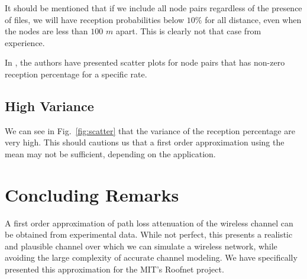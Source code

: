 \documentclass[11pt,twocolumn]{article}
\begin{document}
It should be mentioned that if we include all node pairs regardless of the presence of files, we will have reception probabilities below $10 \%$ for all distance, even when the nodes are less than $100$ $m$ apart.  This is clearly not that case from experience.

In \cite{Aguayo:2004lr}, the authors have presented scatter plots for node pairs that has non-zero reception percentage for a specific rate.

\subsection{High Variance}
We can see in Fig.~\ref{fig:scatter} that the variance of the reception percentage are very high.  This should cautions us that a first order approximation using the mean may not be sufficient, depending on the application.

\section{Concluding Remarks}
A first order approximation of path loss attenuation of the wireless channel can be obtained from experimental data.  While not perfect, this presents a realistic and plausible channel over which we can simulate a wireless network, while avoiding the large complexity of accurate channel modeling.  We have specifically presented this approximation for the MIT's Roofnet project.



\end{document}
